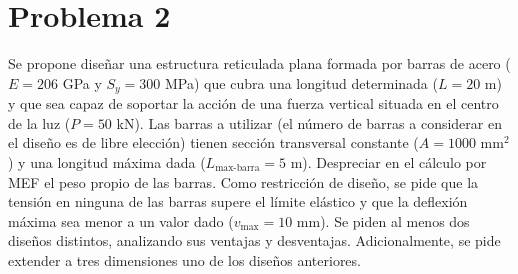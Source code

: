 
\newpage
 \section*{Problema 2}
 
Se propone diseñar una estructura reticulada plana formada por barras de acero
($E = 206$ GPa y $S_y = 300$ MPa) que cubra una longitud determinada
($L = 20$ m) y que sea capaz de soportar la acción de una fuerza vertical
situada en el centro de la luz ($P = 50$ kN). Las barras a utilizar (el número
de barras a considerar en el diseño es de libre elección) tienen sección
transversal constante ($A = 1000$ mm$^2$) y una longitud máxima dada
($L_{\text{max-barra}} = 5$ m). Despreciar en el cálculo por MEF el peso
propio de las barras. Como restricción de diseño, se pide que la tensión en
ninguna de las barras supere el límite elástico y que la deflexión máxima sea
menor a un valor dado ($v_{\max} = 10$ mm). Se piden al menos dos diseños
distintos, analizando sus ventajas y desventajas. Adicionalmente, se pide
extender a tres dimensiones uno de los diseños anteriores.
 
\bigskip
 
\begin{center}
\end{center}

